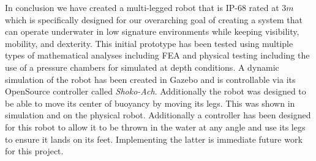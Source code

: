 In conclusion we have created a multi-legged robot that is IP-68 rated at 3$m$ which is specifically designed for our overarching goal of creating a system that can operate underwater in low signature environments while keeping visibility, mobility, and dexterity.
This initial prototype has been tested using multiple types of mathematical analyses including FEA and physical testing including the use of a pressure chambers for simulated at depth conditions.
A dynamic simulation of the robot has been created in Gazebo and is controllable via its OpenSource controller called \textit{Shoko-Ach}.
Additionally the robot was designed to be able to move its center of buoyancy by moving its legs.
This was shown in simulation and on the physical robot.
Additionally a controller has been designed for this robot to allow it to be thrown in the water at any angle and use its legs to ensure it lands on its feet.
Implementing the latter is immediate future work for this project.